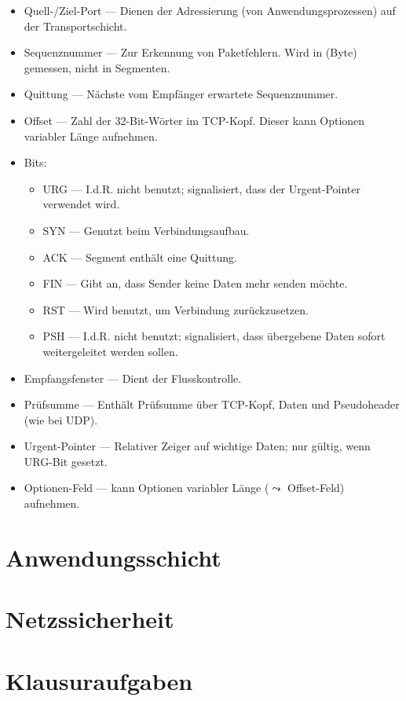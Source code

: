 \documentclass[a4paper, 14pt]{article}
\begin{document}
	\begin{itemize}
		\item Quell-/Ziel-Port --- Dienen der Adressierung (von Anwendungsprozessen) auf der Transportschicht.
		\item Sequenznummer --- Zur Erkennung von Paketfehlern. Wird in \si{\byte} (Byte) gemessen, nicht in Segmenten.
		\item Quittung --- Nächste vom Empfänger erwartete Sequenznummer.
		\item Offset --- Zahl der 32-Bit-Wörter im TCP-Kopf. Dieser kann Optionen variabler Länge aufnehmen.
		\item Bits:
		\begin{itemize}
			\item URG --- I.d.R. nicht benutzt; signalisiert, dass der Urgent-Pointer verwendet wird.
			\item SYN --- Genutzt beim Verbindungsaufbau.
			\item ACK --- Segment enthält eine Quittung.
			\item FIN --- Gibt an, dass Sender keine Daten mehr senden möchte.
			\item RST --- Wird benutzt, um Verbindung zurückzusetzen.
			\item PSH --- I.d.R. nicht benutzt; signalisiert, dass übergebene Daten sofort weitergeleitet werden sollen.
		\end{itemize}
		\item Empfangsfenster --- Dient der Flusskontrolle.
		\item Prüfsumme --- Enthält Prüfsumme über TCP-Kopf, Daten und Pseudoheader (wie bei UDP).
		\item Urgent-Pointer --- Relativer Zeiger auf wichtige Daten; nur gültig, wenn URG-Bit gesetzt.
		\item Optionen-Feld --- kann Optionen variabler Länge ($\leadsto$ Offset-Feld) aufnehmen.
	\end{itemize}

	\section{Anwendungsschicht}

	\section{Netzssicherheit}

	\section{Klausuraufgaben}
\end{document}
